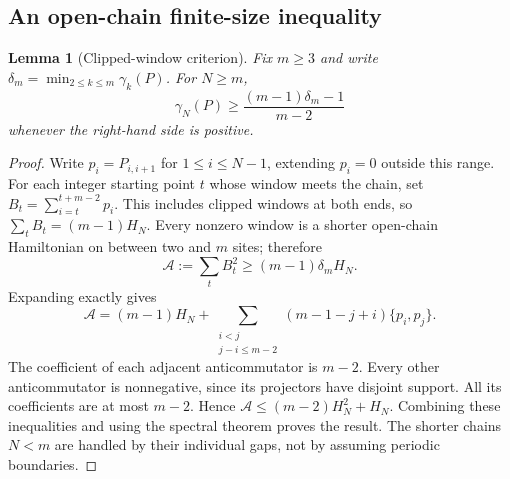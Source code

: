 \documentclass[11pt,a4paper]{article}
\newtheorem{lemma}[theorem]{Lemma}
\theoremstyle{remark}\newtheorem{remark}[theorem]{Remark}
\begin{document}
\subsection{An open-chain finite-size inequality}
\begin{lemma}[Clipped-window criterion]\label{lem:windows}
Fix $m\ge3$ and write $\delta_m=\min_{2\le k\le m}\gamma_k(P)$. For $N\ge m$,
\begin{equation}\label{eq:finite-size}
 \gamma_N(P)\ge\frac{(m-1)\delta_m-1}{m-2}
\end{equation}
whenever the right-hand side is positive.
\end{lemma}
\begin{proof}
Write $p_i=P_{i,i+1}$ for $1\le i\le N-1$, extending $p_i=0$ outside this range. For each integer starting point $t$ whose window meets the chain, set
$B_t=\sum_{i=t}^{t+m-2}p_i$. This includes clipped windows at both ends, so
$\sum_tB_t=(m-1)H_N$. Every nonzero window is a shorter open-chain Hamiltonian on between two and $m$ sites; therefore
\[
 \mathcal A:=\sum_tB_t^2\ge(m-1)\delta_m H_N.
\]
Expanding exactly gives
\[
 \mathcal A=(m-1)H_N+
 \sum_{\substack{i<j\\j-i\le m-2}}(m-1-j+i)\{p_i,p_j\}.
\]
The coefficient of each adjacent anticommutator is $m-2$. Every other anticommutator is nonnegative, since its projectors have disjoint support. All its coefficients are at most $m-2$. Hence
$\mathcal A\le(m-2)H_N^2+H_N$.
Combining these inequalities and using the spectral theorem proves the result. The shorter chains $N<m$ are handled by their individual gaps, not by assuming periodic boundaries.
\end{proof}
\end{document}
